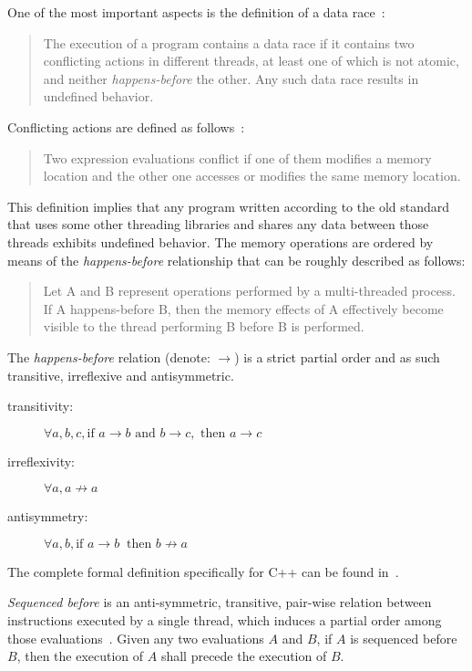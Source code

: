 \documentclass[a4paper,12pt,notitlepage,twoside,openright]{article}
\begin{document}
One of the most important aspects is the definition of a data
race~\cite[1.10.21, p. 14]{c++11_standard}:
\begin{quote}
	The execution of a program contains a data race if it contains
        two conflicting actions in different threads, at least one of
        which is not atomic, and neither \emph{happens-before} the
        other. Any such data race results in undefined behavior.
\end{quote}
Conflicting actions are defined as follows~\cite[1.10.4,
  p. 11]{c++11_standard}:
\begin{quote}
	Two expression evaluations conflict if one of them modifies a
        memory location and the other one accesses or modifies the
        same memory location.
\end{quote}
This definition implies that any program written according to the old
standard that uses some other threading libraries and shares any data
between those threads exhibits undefined behavior.  The memory
operations are ordered by means of the \emph{happens-before}
relationship that can be roughly described as follows:
\begin{quote}
	Let A and B represent operations performed by a multi-threaded
        process. If A happens-before B, then the memory effects of A
        effectively become visible to the thread performing B before B
        is performed.
\end{quote}
The \emph{happens-before} relation (denote: $\to$) is a strict partial
order and as such transitive, irreflexive and antisymmetric.
\begin{description}
	\item[transitivity:] $\forall a, b, c, \textrm{if } a \to b
          \textrm{ and } b \to c, \textrm{ then } a \to c$
	\item[irreflexivity:] $\forall a, a \not\to a$
	\item[antisymmetry:] $\forall a, b, \textrm{if } a \to b\ \textrm{ then } b \not\to a$
\end{description}

The complete formal definition specifically for C++ can be found
in~\cite[1.10, p. 11-14]{c++11_standard}.

\emph{Sequenced before} is an anti-symmetric, transitive, pair-wise
relation between instructions executed by a single thread, which
induces a partial order among those evaluations~\cite[1.9.13,
  p. 10]{c++11_standard}. Given any two evaluations $A$ and $B$, if
$A$ is sequenced before $B$, then the execution of $A$ shall precede
the execution of $B$.
\end{document}
